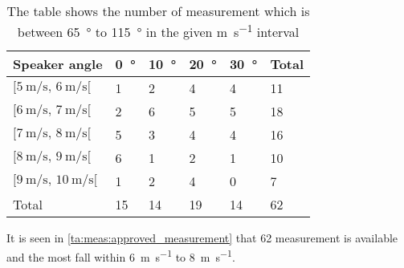 \begin{table}[]
\centering
\caption{The table shows the number of measurement which is between \SI{65}{\degree} to \SI{115}{\degree} in the given \si{\meter\per\second} interval}
\begin{tabular}{l|l|l|l|l|l}
Speaker angle & \SI{0}{\degree}  & \SI{10}{\degree} & \SI{20}{\degree} & \SI{30}{\degree} & Total \\ \hline
$[\SI{5}{\meter\per\second},\, \SI{6}{\meter\per\second}[ $         & 1  & 2  & 4  & 4  & 11    \\
$[\SI{6}{\meter\per\second},\, \SI{7}{\meter\per\second}[$           & 2  & 6  & 5  & 5  & 18    \\
$[\SI{7}{\meter\per\second},\, \SI{8}{\meter\per\second}[ $          & 5  & 3  & 4  & 4  & 16    \\
$[\SI{8}{\meter\per\second},\, \SI{9}{\meter\per\second}[ $          & 6  & 1  & 2  & 1  & 10    \\
$[\SI{9}{\meter\per\second},\, \SI{10}{\meter\per\second}[  $        & 1  & 2  & 4  & 0  & 7     \\ \hline
Total         & 15 & 14 & 19 & 14 &   62   
\end{tabular}
\label{ta:meas:approved_measurement}
\end{table}

It is seen in \autoref{ta:meas:approved_measurement} that 62 measurement is available and the most fall within \SI{6}{\meter\per\second} to \SI{8}{\meter\per\second}.


